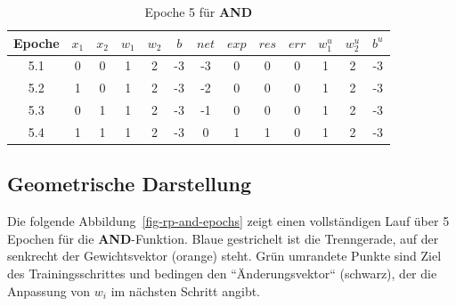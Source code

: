 \setlength{\tabcolsep}{0.8em}
\begin{table} %
    \centering
    \begin{tabular}{c | c | c | c | c | c | c | c | c | c | c | c | c}
        Epoche & $x_1$ & $x_2$ & $w_1$ & $w_2$ & $b$ & $net$ & $exp$ & $res$ & $err$ & $w^u_1$ & $w^u_2$ & $b^u$ \\
        \hline
        5.1& 0     & 0     & 1     & 2     & -3  & -3    & 0     & 0     & 0   & 1       & 2       & -3    \\
        5.2& 1     & 0     & 1     & 2     & -3  & -2    & 0     & 0     & 0   & 1       & 2       & -3    \\
        5.3& 0     & 1     & 1     & 2     & -3  & -1    & 0     & 0     & 0   & 1       & 2       & -3    \\
        5.4& 1     & 1     & 1     & 2     & -3  & 0     & 1     & 1     & 0   & 1       & 2       & -3    \\
    \end{tabular}
    \caption{Epoche 5 für \textbf{AND}}
    \label{tab:mcp-andep5}
\end{table}


\subsection{Geometrische Darstellung}

Die folgende Abbildung~\ref{fig-rp-and-epochs} zeigt einen vollständigen Lauf über 5 Epochen für die \textbf{AND}-Funktion.
Blaue gestrichelt ist die Trenngerade, auf der senkrecht der Gewichtsvektor (orange) steht.
Grün umrandete Punkte sind Ziel des Trainingsschrittes und bedingen den ``Änderungsvektor`` (schwarz), der die Anpassung von $w_i$ im nächsten Schritt angibt.

